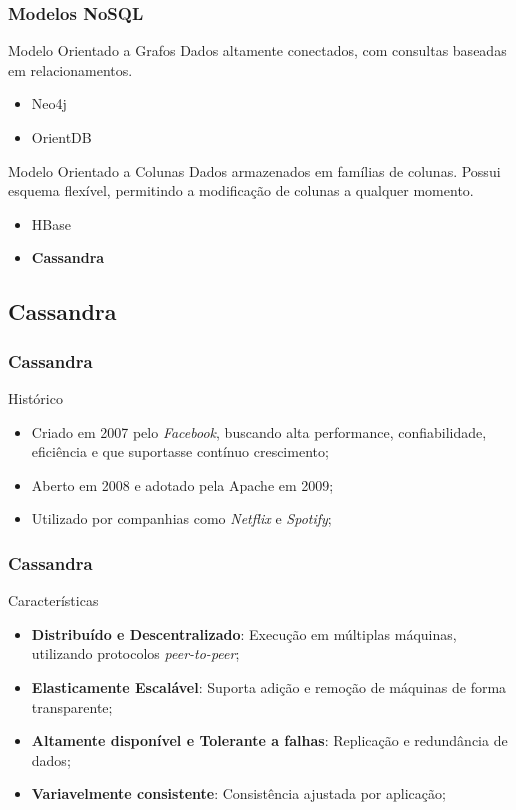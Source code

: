 \documentclass[brazil]{beamer}
\begin{document}
\begin{frame}
	\frametitle{Modelos NoSQL}
	
	\begin{block}{Modelo Orientado a Grafos}
		Dados altamente conectados, com consultas baseadas em relacionamentos.
		\begin{itemize}
			\item Neo4j
			\item OrientDB
		\end{itemize}
	\end{block}

	\begin{block}{Modelo Orientado a Colunas}
		Dados armazenados em famílias de colunas. Possui esquema flexível, permitindo a modificação de colunas a qualquer momento.
		\begin{itemize}
			\item HBase
			\item \textbf{Cassandra}
		\end{itemize}
	\end{block}

\end{frame}


\subsection{Cassandra}
\begin{frame}
	\frametitle{Cassandra}
	\begin{block}{Histórico}
	\begin{itemize}
		\item Criado em 2007 pelo \emph{Facebook}, buscando alta performance, confiabilidade, eficiência e que suportasse  contínuo crescimento;
		\item Aberto em 2008 e adotado pela Apache em 2009;
		\item Utilizado por companhias como \emph{Netflix} e \emph{Spotify};
	\end{itemize}
	\end{block}
\end{frame}

\begin{frame}
	\frametitle{Cassandra}
	\begin{block}{Características}
		\begin{itemize}
			\item \textbf{Distribuído e Descentralizado}: Execução em múltiplas máquinas, utilizando protocolos \emph{peer-to-peer};
			
			\item \textbf{Elasticamente Escalável}: Suporta adição e remoção de máquinas de forma transparente;
			
			\item \textbf{Altamente disponível e Tolerante a falhas}: Replicação e redundância de dados;
			
			\item \textbf{Variavelmente consistente}: Consistência ajustada por aplicação;
		\end{itemize} 
	\end{block}
\end{frame}
\end{document}
